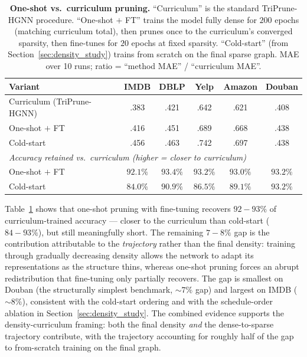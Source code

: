 \documentclass[10pt]{article}
\theoremstyle{plain}
\theoremstyle{definition}
\begin{document}
\begin{table}[ht!]
\centering
\caption{\textbf{One-shot vs.\ curriculum pruning.} ``Curriculum'' is the standard TriPrune-HGNN procedure. ``One-shot $+$ FT'' trains the model fully dense for $200$ epochs (matching curriculum total), then prunes once to the curriculum's converged sparsity, then fine-tunes for $20$ epochs at fixed sparsity. ``Cold-start'' (from Section~\ref{sec:density_study}) trains from scratch on the final sparse graph. MAE over 10 runs; ratio = ``method MAE'' / ``curriculum MAE''.}
\label{tab:curriculum_baselines}
\setlength{\tabcolsep}{4pt}
\renewcommand{\arraystretch}{1.1}
\small
\begin{tabular}{lccccc}
\toprule
\textbf{Variant} & IMDB & DBLP & Yelp & Amazon & Douban \\
\midrule
\rowcolor{blue!10}
Curriculum (TriPrune-HGNN)
                  & .383 & .421 & .642 & .621 & .408 \\
One-shot $+$ FT   & .416 & .451 & .689 & .668 & .438 \\
Cold-start        & .456 & .463 & .742 & .697 & .438 \\
\midrule
\multicolumn{6}{l}{\textit{Accuracy retained vs.\ curriculum (higher = closer to curriculum)}} \\
One-shot $+$ FT   & $92.1\%$ & $93.4\%$ & $93.2\%$ & $93.0\%$ & $93.2\%$ \\
Cold-start        & $84.0\%$ & $90.9\%$ & $86.5\%$ & $89.1\%$ & $93.2\%$ \\
\bottomrule
\end{tabular}
\end{table}

Table~\ref{tab:curriculum_baselines} shows that one-shot pruning with fine-tuning recovers $92\!-\!93\%$ of curriculum-trained accuracy --- closer to the curriculum than cold-start ($84\!-\!93\%$), but still meaningfully short. The remaining $7\!-\!8\%$ gap is the contribution attributable to the \emph{trajectory} rather than the final density: training through gradually decreasing density allows the network to adapt its representations as the structure thins, whereas one-shot pruning forces an abrupt redistribution that fine-tuning only partially recovers. The gap is smallest on Douban (the structurally simplest benchmark, $\sim\!7\%$ gap) and largest on IMDB ($\sim\!8\%$), consistent with the cold-start ordering and with the schedule-order ablation in Section~\ref{sec:density_study}. The combined evidence supports the density-curriculum framing: both the final density \emph{and} the dense-to-sparse trajectory contribute, with the trajectory accounting for roughly half of the gap to from-scratch training on the final graph.
\end{document}

